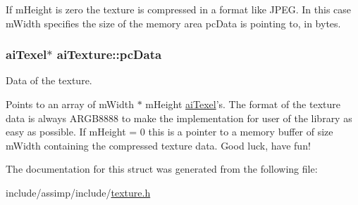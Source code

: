 If m\-Height is zero the texture is compressed in a format like J\-P\-E\-G. In this case m\-Width specifies the size of the memory area pc\-Data is pointing to, in bytes. \hypertarget{structai_texture_aeb07528748b6e49d2d81c60006024f9a}{
\subsubsection[{pc\-Data}]{ {\bf ai\-Texel}$\ast$ ai\-Texture\-::pc\-Data}}\label{structai_texture_aeb07528748b6e49d2d81c60006024f9a}
Data of the texture.

Points to an array of m\-Width $\ast$ m\-Height \hyperlink{structai_texel}{ai\-Texel}'s. The format of the texture data is always A\-R\-G\-B8888 to make the implementation for user of the library as easy as possible. If m\-Height = 0 this is a pointer to a memory buffer of size m\-Width containing the compressed texture data. Good luck, have fun! 

The documentation for this struct was generated from the following file\-:\begin{DoxyCompactItemize}
\item 
include/assimp/include/\hyperlink{texture_8h}{texture.\-h}\end{DoxyCompactItemize}
